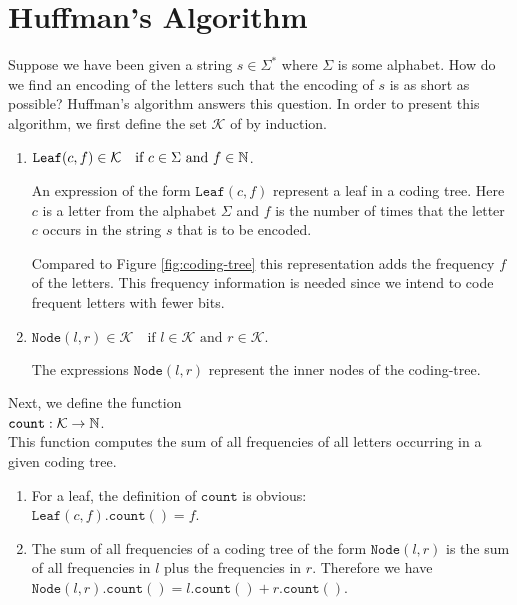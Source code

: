 \section{Huffman's Algorithm}
Suppose we have been given a string $s \in \Sigma^*$ where $\Sigma$ is some alphabet.  How do we find an encoding of the letters such 
that the encoding of $s$ is as short as possible?  Huffman's algorithm answers this question.  In order 
to present this algorithm, we first define the set $\mathcal{K}$ of  by induction.
\begin{enumerate}
\item $\texttt{Leaf}(c,f) \in \mathcal{K} \quad \mbox{if $c \in \Sigma$ and $f \in {\mathbb N}$}$.

      An expression of the form $\texttt{Leaf}(c,f)$ represent a leaf in a coding tree.  Here  $c$ is a letter
      from the alphabet $\Sigma$ and $f$ is the number of times that the letter $c$ occurs in the string $s$
      that is to be encoded.

      Compared to Figure \ref{fig:coding-tree} this representation adds the frequency $f$ of the letters.
      This frequency information is needed since we intend to code frequent letters with fewer bits.
\item $\texttt{Node}(l,r) \in \mathcal{K} \quad \mbox{if $l \in\mathcal{K}$ and $r \in \mathcal{K}$.}$ 

      The expressions $\texttt{Node}(l,r)$ represent the inner nodes of the coding-tree.
\end{enumerate}
Next, we define the function
\\[0.2cm]
\hspace*{1.3cm}
$\texttt{count} : \mathcal{K} \rightarrow {\mathbb N}$.
\\[0.2cm] 
This function computes the sum of all frequencies of all letters occurring in a given coding tree.
\begin{enumerate}
\item For a leaf, the definition of $\texttt{count}$ is obvious:
      \\[0.2cm]
      \hspace*{1.3cm}
      $\texttt{Leaf}(c,f).\texttt{count}() = f$.
\item The sum of all frequencies of a coding tree of the form $\texttt{Node}(l,r)$ is the sum of all frequencies
      in $l$ plus the frequencies in $r$.  Therefore we have
      \\[0.2cm]
      \hspace*{1.3cm}
      $\texttt{Node}(l,r).\texttt{count}() = l.\texttt{count}() + r.\texttt{count}()$. 
\end{enumerate}
